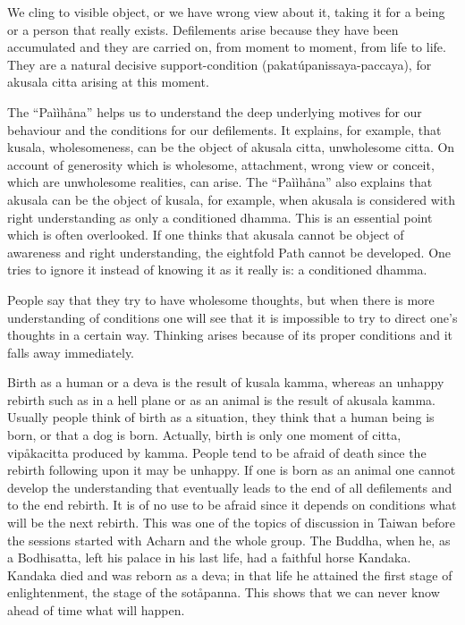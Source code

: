 \documentclass[10pt,a4paper,final]{article}
\begin{document}
We cling to visible
object, or we have wrong view about it, taking it for a being or a
person that really exists. Defilements arise because they have been
accumulated and they are carried on, from moment to moment, from life to
life. They are a natural decisive support-condition
(pakatúpanissaya-paccaya),
for akusala citta arising at this moment. 

The
``Paììhåna'' helps us to
understand the deep underlying motives for our behaviour and the
conditions for our defilements. It explains, for example, that kusala,
wholesomeness, can be the object of akusala citta, unwholesome citta. On
account of generosity which is wholesome, attachment, wrong view or
conceit, which are unwholesome realities, can arise. The
``Paììhåna''
also explains that akusala can be the
object of kusala, for example, when akusala is considered with
right understanding as only a conditioned dhamma.
This is an essential point which is
often overlooked. If one thinks that akusala cannot be object of
awareness and right understanding, the eightfold Path cannot be
developed. One tries to ignore it instead of knowing it as
it really is: a conditioned dhamma. 

People say that they try to have wholesome
thoughts, but when there is more understanding of conditions one will
see that it is impossible to try to direct one's thoughts in a certain
way. Thinking arises because of its proper conditions and it falls away
immediately.

Birth as a human or a deva is the result of
kusala kamma, whereas an unhappy rebirth such as in a hell plane or as
an animal is the result of akusala kamma. Usually people think of birth
as a situation, they think that a human being is born, or that a dog is
born. Actually, birth is only one moment of citta, vipåkacitta produced
by kamma. People tend to be afraid of death since the rebirth following
upon it may be unhappy. If one is born as an animal one cannot develop
the understanding that eventually leads to the end of all defilements
and to the end rebirth. It is of no use to be afraid since it depends on
conditions what will be the next rebirth. This was one of the topics of
discussion in Taiwan before the sessions started with Acharn and the
whole group. The Buddha, when he, as a Bodhisatta, left his palace in
his last life, had a faithful horse Kandaka. Kandaka died and was reborn
as a deva; in that life he attained the first stage of enlightenment,
the stage of the sotåpanna. This shows that we can never know ahead of
time what will happen. 
\end{document}
